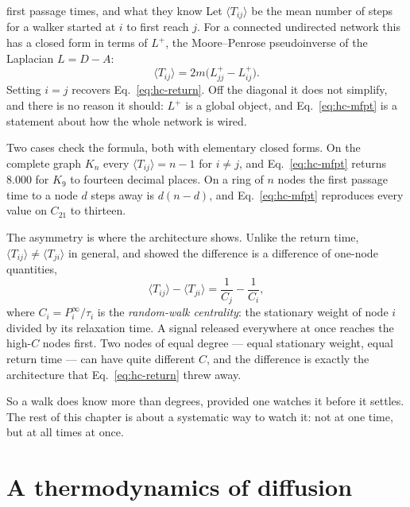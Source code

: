 \begin{calculation}{first passage times, and what they know}
Let $\langle T_{ij}\rangle$ be the mean number of steps for a walker started at $i$
to first reach $j$. For a connected undirected network this has a closed form in
terms of $L^{+}$, the Moore--Penrose pseudoinverse of the Laplacian $L=D-A$:
\begin{equation}
  \langle T_{ij}\rangle = 2m\big(L^{+}_{jj} - L^{+}_{ij}\big).
  \label{eq:hc-mfpt}
\end{equation}
Setting $i=j$ recovers Eq.~\eqref{eq:hc-return}. Off the diagonal it does not
simplify, and there is no reason it should: $L^{+}$ is a global object, and
Eq.~\eqref{eq:hc-mfpt} is a statement about how the whole network is wired.

Two cases check the formula, both with elementary closed forms. On the complete
graph $K_n$ every $\langle T_{ij}\rangle=n-1$ for $i\neq j$, and
Eq.~\eqref{eq:hc-mfpt} returns $8.000$ for $K_9$ to fourteen decimal places. On a
ring of $n$ nodes the first passage time to a node $d$ steps away is $d(n-d)$, and
Eq.~\eqref{eq:hc-mfpt} reproduces every value on $C_{21}$ to thirteen.

The asymmetry is where the architecture shows. Unlike the return time,
$\langle T_{ij}\rangle \neq \langle T_{ji}\rangle$ in general, and
\citet{noh2004} showed the difference is a difference of one-node quantities,
\begin{equation}
  \langle T_{ij}\rangle - \langle T_{ji}\rangle = \frac{1}{C_j} - \frac{1}{C_i},
  \label{eq:hc-rwc}
\end{equation}
where $C_i = P^\infty_i/\tau_i$ is the \emph{random-walk centrality}: the
stationary weight of node $i$ divided by its relaxation time. A signal released
everywhere at once reaches the high-$C$ nodes first. Two nodes of equal degree ---
equal stationary weight, equal return time --- can have quite different $C$, and the
difference is exactly the architecture that Eq.~\eqref{eq:hc-return} threw away.
\end{calculation}

So a walk does know more than degrees, provided one watches it before it settles.
The rest of this chapter is about a systematic way to watch it: not at one time, but
at all times at once.

\section{A thermodynamics of diffusion}

